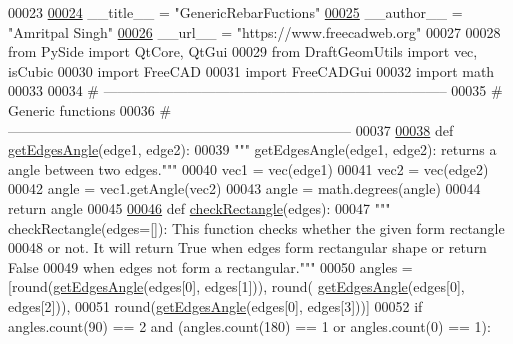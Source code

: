 \begin{DoxyCode}
00023 
\hypertarget{Rebarfunc_8py_source.tex_l00024}{}\hyperlink{namespaceRebarfunc_abd5b4d35a8537923b223274433b692e9}{00024} \_\_title\_\_ = \textcolor{stringliteral}{"GenericRebarFuctions"}
\hypertarget{Rebarfunc_8py_source.tex_l00025}{}\hyperlink{namespaceRebarfunc_aae2a5c81818721137a6cd0f3b66005cb}{00025} \_\_author\_\_ = \textcolor{stringliteral}{"Amritpal Singh"}
\hypertarget{Rebarfunc_8py_source.tex_l00026}{}\hyperlink{namespaceRebarfunc_a11e5d55bb1ddb9fe8f97d06b7916bb22}{00026} \_\_url\_\_ = \textcolor{stringliteral}{"https://www.freecadweb.org"}
00027 
00028 \textcolor{keyword}{from} PySide \textcolor{keyword}{import} QtCore, QtGui
00029 \textcolor{keyword}{from} DraftGeomUtils \textcolor{keyword}{import} vec, isCubic
00030 \textcolor{keyword}{import} FreeCAD
00031 \textcolor{keyword}{import} FreeCADGui
00032 \textcolor{keyword}{import} math
00033 
00034 \textcolor{comment}{# --------------------------------------------------------------------------}
00035 \textcolor{comment}{# Generic functions}
00036 \textcolor{comment}{# --------------------------------------------------------------------------}
00037 
\hypertarget{Rebarfunc_8py_source.tex_l00038}{}\hyperlink{namespaceRebarfunc_a3c75160aea4e3fd67b08c557e53a6910}{00038} \textcolor{keyword}{def }\hyperlink{namespaceRebarfunc_a3c75160aea4e3fd67b08c557e53a6910}{getEdgesAngle}(edge1, edge2):
00039     \textcolor{stringliteral}{""" getEdgesAngle(edge1, edge2): returns a angle between two edges."""}
00040     vec1 = vec(edge1)
00041     vec2 = vec(edge2)
00042     angle = vec1.getAngle(vec2)
00043     angle = math.degrees(angle)
00044     \textcolor{keywordflow}{return} angle
00045 
\hypertarget{Rebarfunc_8py_source.tex_l00046}{}\hyperlink{namespaceRebarfunc_a24ab60160ea54e86c0ce1b727621bf71}{00046} \textcolor{keyword}{def }\hyperlink{namespaceRebarfunc_a24ab60160ea54e86c0ce1b727621bf71}{checkRectangle}(edges):
00047     \textcolor{stringliteral}{""" checkRectangle(edges=[]): This function checks whether the given form rectangle}
00048 \textcolor{stringliteral}{        or not. It will return True when edges form rectangular shape or return False}
00049 \textcolor{stringliteral}{        when edges not form a rectangular."""}
00050     angles = [round(\hyperlink{namespaceRebarfunc_a3c75160aea4e3fd67b08c557e53a6910}{getEdgesAngle}(edges[0], edges[1])), round(
      \hyperlink{namespaceRebarfunc_a3c75160aea4e3fd67b08c557e53a6910}{getEdgesAngle}(edges[0], edges[2])),
00051             round(\hyperlink{namespaceRebarfunc_a3c75160aea4e3fd67b08c557e53a6910}{getEdgesAngle}(edges[0], edges[3]))]
00052     \textcolor{keywordflow}{if} angles.count(90) == 2 \textcolor{keywordflow}{and} (angles.count(180) == 1 \textcolor{keywordflow}{or} angles.count(0) == 1):

\end{DoxyCode}
